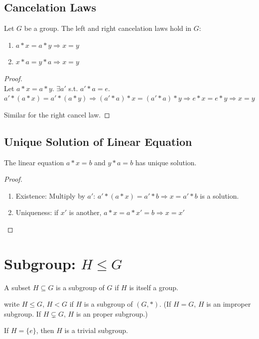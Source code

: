 \documentclass[11pt]{elegantbook}
\begin{document}
\subsection{Cancelation Laws}
\begin{theorem}
Let $G$ be a group. The left and right cancelation laws hold in $G$:
\begin{enumerate}
    \item $a*x=a*y \Rightarrow x=y$
    \item $x*a=y*a \Rightarrow x=y$
\end{enumerate}
\end{theorem}
\begin{proof}
\quad\\
Let $a*x=a*y$. $\exists a'$ s.t. $a'*a=e$. $a'*(a*x)=a'*(a*y) \Rightarrow (a'*a)*x=(a'*a)*y \Rightarrow	e*x=e*y \Rightarrow	x=y$

Similar for the right cancel law.
\end{proof}

\subsection{Unique Solution of Linear Equation}
\begin{theorem}
The linear equation $a*x=b$ and $y*a=b$ has unique solution.
\end{theorem}
\begin{proof}
\quad\\
\begin{enumerate}
    \item Existence: Multiply by $a'$: $a'*(a*x)=a'*b \Rightarrow x=a'*b$ is a solution.
    \item Uniqueness: if $x'$ is another, $a*x=a*x'=b \Rightarrow x=x'$
\end{enumerate}
\end{proof}



\section{Subgroup: $H\leq G$}
\begin{definition}
A subset $H\subseteq G$ is a subgroup of $G$ if $H$ is itself a group.
\end{definition}
write $H\leq G$, $H<G$ if $H$ is a subgroup of $(G, *)$. (If $H=G$, $H$ is an improper subgroup. If $H\subsetneq G$, $H$ is an proper subgroup.)

If $H=\{e\}$, then $H$ is a trivial subgroup.
\end{document}
